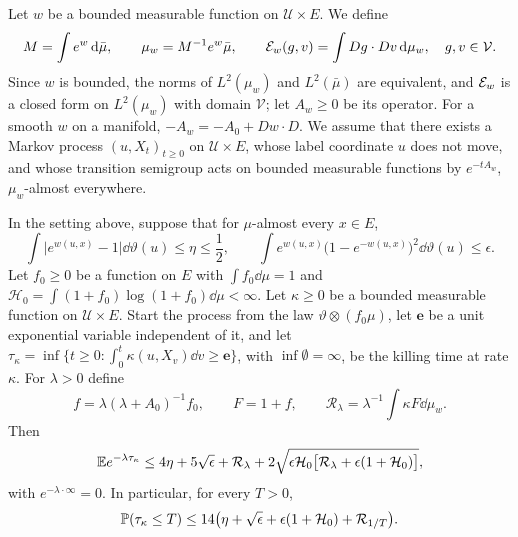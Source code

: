 Let $w$ be a bounded measurable function on $\mathcal U\times E$. We define
\[
 M=\int e^w\,\mathrm d\bar\mu,\qquad \mu_w=M^{-1}e^w\bar\mu,\qquad
 \mathcal E_w(g,v)=\int Dg\cdot Dv\,\mathrm d\mu_w,\quad g,v\in\mathcal V .
\]
Since $w$ is bounded, the norms of $L^2(\mu_w)$ and $L^2(\bar\mu)$ are
equivalent, and $\mathcal E_w$ is a closed form on $L^2(\mu_w)$ with domain
$\mathcal V$; let $A_w\ge0$ be its operator. For a smooth $w$ on a manifold,
$-A_w=-A_0+Dw\cdot D$. We assume that there exists a Markov process
$(u,X_t)_{t\ge0}$ on $\mathcal U\times E$, whose label coordinate $u$ does not
move, and whose transition semigroup acts on bounded measurable functions by
$e^{-tA_w}$, $\mu_w$-almost everywhere.

\begin{lemma}\label{lem:ent-resolvent}
In the setting above, suppose that for $\mu$-almost every $x\in E$,
\begin{equation}\label{eq:ent-abstract-moments}
 \int\bigl|e^{w(u,x)}-1\bigr|\dd\vartheta(u)\le\eta\le\frac12,
 \qquad
 \int e^{w(u,x)}\bigl(1-e^{-w(u,x)}\bigr)^2\dd\vartheta(u)\le\epsilon .
\end{equation}
Let $f_0\ge0$ be a function on $E$ with $\int f_0\dd\mu=1$ and
$\mathcal H_0=\int(1+f_0)\log(1+f_0)\dd\mu<\infty$. Let $\kappa\ge0$ be a
bounded measurable function on $\mathcal U\times E$. Start the process
from the law $\vartheta\otimes(f_0\mu)$, let $\mathbf e$ be a unit
exponential variable independent of it, and let
$\tau_\kappa=\inf\{t\ge0:\int_0^t\kappa(u,X_v)\dd v\ge\mathbf e\}$, with
$\inf\emptyset=\infty$, be the killing time at rate $\kappa$. For $\lambda>0$ define
\begin{equation}\label{eq:ent-resolvents}
 f=\lambda(\lambda+A_0)^{-1}f_0,\qquad F=1+f,\qquad
 \mathcal R_\lambda=\lambda^{-1}\int\kappa F\dd\mu_w .
\end{equation}
Then
\begin{equation}\label{eq:ent-resolvent-bound}
 \mathbb E e^{-\lambda\tau_\kappa}\le4\eta+5\sqrt\epsilon+\mathcal R_\lambda
 +2\sqrt{\epsilon\mathcal H_0\bigl[\mathcal R_\lambda
   +\epsilon(1+\mathcal H_0)\bigr]},
\end{equation}
with $e^{-\lambda\cdot\infty}=0$. In particular, for every $T>0$,
\begin{equation}\label{eq:ent-resolvent-horizon}
 \mathbb P(\tau_\kappa\le T)\le14\bigl(\eta+\sqrt\epsilon
 +\epsilon(1+\mathcal H_0)+\mathcal R_{1/T}\bigr).
\end{equation}
\end{lemma}

